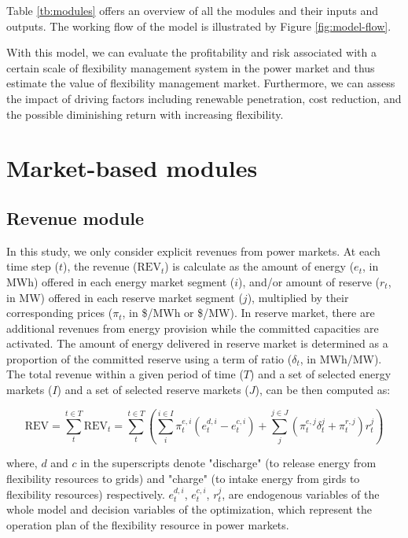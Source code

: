 Table \ref{tb:modules} offers an overview of all the modules and their inputs and outputs. The working flow of the model is illustrated by Figure \ref{fig:model-flow}.

With this model, we can evaluate the profitability and risk associated with a certain scale of flexibility management system in the power market and thus estimate the value of flexibility management market. Furthermore, we can assess the impact of driving factors including renewable penetration, cost reduction, and the possible diminishing return with increasing flexibility.

\section{Market-based modules}

\subsection{Revenue module}

In this study, we only consider explicit revenues from power markets. At each time step ($t$), the revenue ($\text{REV}_t$) is calculate as the amount of energy ($e_t$, in MWh) offered in each energy market segment ($i$), and/or amount of reserve ($r_t$, in MW) offered in each reserve market segment ($j$), multiplied by their corresponding prices ($\pi_t$, in \$/MWh or \$/MW). In reserve market, there are additional revenues from energy provision while the committed capacities are activated. The amount of energy delivered in reserve market is determined as a proportion of the committed reserve using a term of ratio ($\delta_t$, in MWh/MW). The total revenue within a given period of time ($T$) and a set of selected energy markets ($I$) and a set of  selected reserve markets ($J$), can be then computed as:

\begin{equation}
\label{eq:module-revenue}
\text{REV}=  \sum_{t}^{t \in T} \text{REV}_t = \sum_{t}^{t \in T} \left( \sum_{i}^{i \in I}  \pi_t^{e,i} (e_t^{d,i} - e_t^{c,i})  + \sum_{j}^{j \in J} (\pi_t^{e,j} \delta_t^{j} + \pi_t^{r,j}) r_t^j \right)
\end{equation}

where, $d$ and $c$ in the superscripts denote "discharge" (to release energy from flexibility resources to grids) and "charge" (to intake energy from girds to flexibility resources) respectively.  $e_t^{d,i}$, $e_t^{c,i}$, $r_t^{j}$, are endogenous variables of the whole model and decision variables of the optimization, which represent the operation plan of the flexibility resource in power markets.

